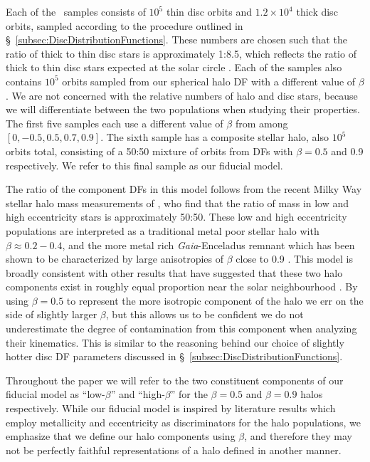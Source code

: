 Each of the \solar\ samples consists of $10^{5}$ thin disc orbits and $1.2\times10^{4}$ thick disc orbits, sampled according to the procedure outlined in \S~\ref{subsec:DiscDistributionFunctions}. These numbers are chosen such that the ratio of thick to thin disc stars is approximately 1:8.5, which reflects the ratio of thick to thin disc stars expected at the solar circle \parencite[e.g. see the potential of][]{mcmillan17}. Each of the samples also contains $10^{5}$ orbits sampled from our spherical halo DF with a different value of $\beta$. We are not concerned with the relative numbers of halo and disc stars, because we will differentiate between the two populations when studying their properties. The first five samples each use a different value of $\beta$ from among $[0,-0.5,0.5,0.7,0.9]$. The sixth sample has a composite stellar halo, also $10^{5}$ orbits total, consisting of a 50:50 mixture of orbits from DFs with $\beta=0.5$ and 0.9 respectively. We refer to this final sample as our fiducial model. 

The ratio of the component DFs in this model follows from the recent Milky Way stellar halo mass measurements of \textcite{mackereth20}, who find that the ratio of mass in low and high eccentricity stars is approximately 50:50. These low and high eccentricity populations are interpreted as a traditional metal poor stellar halo with $\beta \approx 0.2-0.4$, and the more metal rich \textit{Gaia}-Enceladus remnant which has been shown to be characterized by large anisotropies of $\beta$ close to 0.9 \parencite{belokurov18,fattahi19,iorio21}. This model is broadly consistent with other results that have suggested that these two halo components exist in roughly equal proportion near the solar neighbourhood \parencite{belokurov18,lancaster19,iorio21}. By using $\beta=0.5$ to represent the more isotropic component of the halo we err on the side of slightly larger $\beta$, but this allows us to be confident we do not underestimate the degree of contamination from this component when analyzing their kinematics. This is similar to the reasoning behind our choice of slightly hotter disc DF parameters discussed in \S~\ref{subsec:DiscDistributionFunctions}.

Throughout the paper we will refer to the two constituent components of our fiducial model as ``low-$\beta$'' and ``high-$\beta$'' for the $\beta=0.5$ and $\beta=0.9$ halos respectively. While our fiducial model is inspired by literature results which employ metallicity and eccentricity as discriminators for the halo populations, we emphasize that we define our halo components using $\beta$, and therefore they may not be perfectly faithful representations of a halo defined in another manner. 

